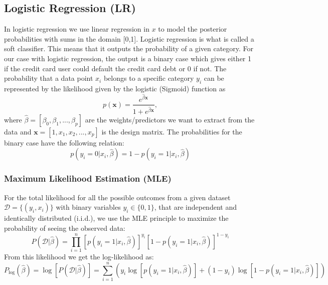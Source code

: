 \documentclass[12pt,a4paper,english]{article}
\begin{document}
\subsection{Logistic Regression (LR)}
\label{subsect:LR}
In logistic regression we use linear regression in $x$ to model the posterior probabilities with sums in the domain [0,1]. Logistic regression is what is called a soft classifier. This means that it outputs the probability of a given category. For our case with logistic regression, the output is a binary case which gives either 1 if the credit card user could default the credit card debt or 0 if not. The probability that a data point $x_i$ belongs to a specific category $y_i$ can be represented by the likelihood given by the logistic (Sigmoid) function as
\begin{equation}
\label{eq:sigmoid}
p(\textbf{x})=\frac{e^{\hat{\beta}\textbf{x}}}{1+e^{\hat{\beta}\textbf{x}}},
\end{equation}
where $\hat{\beta}=[\beta_0,\beta_1,...,\beta_p]$ are the weights/predictors we want to extract from the data and $\textbf{x}=[1,x_1,x_2,...,x_p]$ is the design matrix. The probabilities for the binary case have the following relation:
\begin{equation*}
p(y_i=0|x_i,\hat{\beta})=1-p(y_i=1|x_i,\hat{\beta})
\end{equation*}

\subsubsection{Maximum Likelihood Estimation (MLE)}
\label{subsect:MLE}
For the total likelihood for all the possible outcomes from a given dataset $\mathcal{D}=\{(y_i, x_i)\}$ with binary variables $y_i\in\{0,1\}$, that are independent and identically distributed (i.i.d.), we use the MLE principle to maximize the probability of seeing the observed data:
\begin{equation}
\label{eq:max_likelihood}
P(\mathcal{D}|\hat{\beta})=\prod_{i=1}^{n}\left[p(y_i=1|x_i,\hat{\beta})\right]^{y_i}\left[1-p(y_i=1|x_i,\hat{\beta})\right]^{1-y_i}
\end{equation}
From this likelihood we get the log-likelihood as:
\begin{equation}
\label{eq:log_likelihood}
P_{\log }(\hat{\beta})=\log[P(\mathcal{D}|\hat{\beta})]=\sum_{i=1}^{n}\left(y_i\log[p(y_i=1|x_i,\hat{\beta})]+(1-y_i)\log[1-p(y_i=1|x_i,\hat{\beta})]\right)
\end{equation}
\end{document}
